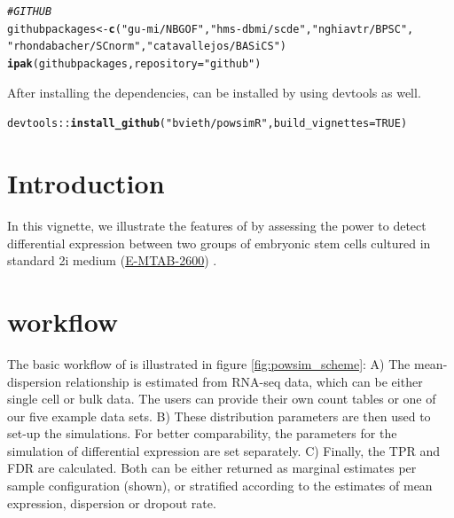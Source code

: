\documentclass{article}\usepackage[]{graphicx}\usepackage[usenames,dvipsnames]{color}
\makeatletter
\newcommand{\hlnum}[1]{\textcolor[rgb]{0.686,0.059,0.569}{#1}}%
\newcommand{\hlstr}[1]{\textcolor[rgb]{0.192,0.494,0.8}{#1}}%
\newcommand{\hlcom}[1]{\textcolor[rgb]{0.678,0.584,0.686}{\textit{#1}}}%
\newcommand{\hlopt}[1]{\textcolor[rgb]{0,0,0}{#1}}%
\newcommand{\hlstd}[1]{\textcolor[rgb]{0.345,0.345,0.345}{#1}}%
\newcommand{\hlkwb}[1]{\textcolor[rgb]{0.69,0.353,0.396}{#1}}%
\newcommand{\hlkwc}[1]{\textcolor[rgb]{0.333,0.667,0.333}{#1}}%
\newcommand{\hlkwd}[1]{\textcolor[rgb]{0.737,0.353,0.396}{\textbf{#1}}}%
\newenvironment{kframe}{%
 \def\at@end@of@kframe{}%
 \ifinner\ifhmode%
  \def\at@end@of@kframe{\end{minipage}}%
  \begin{minipage}{\columnwidth}%
 \fi\fi%
 \def\FrameCommand##1{\hskip\@totalleftmargin \hskip-\fboxsep
 \colorbox{shadecolor}{##1}\hskip-\fboxsep
     \hskip-\linewidth \hskip-\@totalleftmargin \hskip\columnwidth}%
 \MakeFramed {\advance\hsize-\width
   \@totalleftmargin\z@ \linewidth\hsize
   \@setminipage}}%
 {\par\unskip\endMakeFramed%
 \at@end@of@kframe}
\newenvironment{knitrout}{}{} %
\makeatother
\begin{document}
\begin{knitrout}
\begin{kframe}
\begin{alltt}
\hlcom{# GITHUB}
\hlstd{githubpackages} \hlkwb{<-} \hlkwd{c}\hlstd{(}\hlstr{"gu-mi/NBGOF"}\hlstd{,} \hlstr{"hms-dbmi/scde"}\hlstd{,} \hlstr{"nghiavtr/BPSC"}\hlstd{,}
    \hlstr{"rhondabacher/SCnorm"}\hlstd{,} \hlstr{"catavallejos/BASiCS"}\hlstd{)}
\hlkwd{ipak}\hlstd{(githubpackages,} \hlkwc{repository} \hlstd{=} \hlstr{"github"}\hlstd{)}
\end{alltt}
\end{kframe}
\end{knitrout}

After installing the dependencies,  can be installed by using devtools as well.

\begin{knitrout}
\color{fgcolor}\begin{kframe}
\begin{alltt}
\hlstd{devtools}\hlopt{::}\hlkwd{install_github}\hlstd{(}\hlstr{"bvieth/powsimR"}\hlstd{,} \hlkwc{build_vignettes} \hlstd{=} \hlnum{TRUE}\hlstd{)}
\end{alltt}
\end{kframe}
\end{knitrout}


\section{Introduction}

In this vignette, we illustrate the features of  by assessing the power to detect differential expression between two groups of embryonic stem cells cultured in standard 2i medium (\href{http://www.ebi.ac.uk/arrayexpress/experiments/E-MTAB-2600/}{E-MTAB-2600}) \cite{Kolodziejczyk2015-vn}.

\section{ workflow}

The basic workflow of  is illustrated in figure \ref{fig:powsim_scheme}: A) The mean-dispersion relationship is estimated from RNA-seq data, which can be either single cell or bulk data. The users can provide their own count tables or one of our five example data sets. B) These distribution parameters are then used to set-up the simulations. For better comparability, the parameters for the simulation of differential expression are set separately. C) Finally, the TPR and FDR are calculated. Both can be either returned as marginal estimates per sample configuration (shown), or stratified according to the estimates of mean expression, dispersion or dropout rate.
\end{document}
